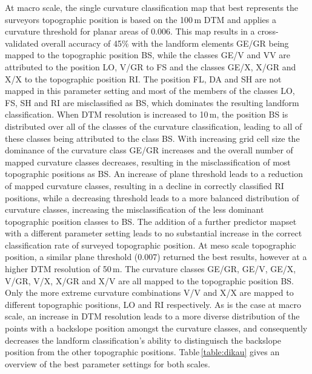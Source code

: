 \documentclass[preprint,12pt,authoryear]{elsarticle}
\begin{document}
 At macro scale, the single curvature classification map that best represents the surveyors topographic position is based on the 100\,m DTM and applies a curvature threshold for planar areas of 0.006. This map results in a cross-validated overall accuracy of 45\% with the landform elements GE/GR being mapped to the topographic position BS, while the classes GE/V and VV are attributed to the position LO, V/GR to FS and the classes GE/X, X/GR and X/X to the topographic position RI. The position FL, DA and SH are not mapped in this parameter setting and most of the members of the classes LO, FS, SH and RI are misclassified as BS, which dominates the resulting landform classification. When DTM resolution is increased to 10\,m, the position BS is distributed over all of the classes of the curvature classification, leading to all of these classes being attributed to the class BS. With increasing grid cell size the dominance of the curvature class GE/GR increases and the overall number of mapped curvature classes decreases, resulting in the misclassification of most topographic positions as BS. An increase of plane threshold leads to a reduction of mapped curvature classes, resulting in a decline in correctly classified RI positions, while a decreasing threshold leads to a more balanced distribution of curvature classes, increasing the misclassification of the less dominant topographic position classes to BS. The addition of a further predictor mapset with a different parameter setting leads to no substantial increase in the correct classification rate of surveyed topographic position.
At meso scale topographic position, a similar plane threshold (0.007) returned the best results, however at a higher DTM resolution of 50\,m. The curvature classes GE/GR, GE/V, GE/X, V/GR, V/X, X/GR and X/V are all mapped to the topographic position BS. Only the more extreme curvature combinations V/V and X/X are mapped to different topographic positions, LO and RI respectively. As is the case at macro scale, an increase in DTM resolution leads to a more diverse distribution of the points with a backslope position amongst the curvature classes, and consequently decreases the landform classification's ability to distinguisch the backslope position from the other topographic positions. Table\,\ref{table:dikau} gives an overview of the best parameter settings for both scales.
\end{document}
